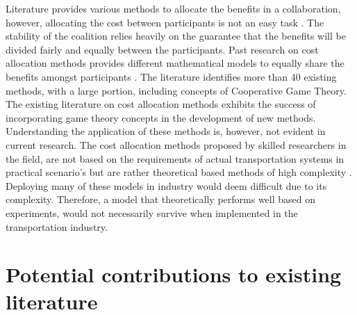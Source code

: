 Literature provides various methods to allocate the benefits in a collaboration, however, allocating the cost between participants is not an easy task \citep{lozano2013cooperative}. The stability of the coalition relies heavily on the guarantee that the benefits will be divided fairly and equally between the participants. Past research on cost allocation methods provides different mathematical models to equally share the benefits amongst participants \citep{lozano2013cooperative}. The literature identifies more than 40 existing methods, with a large portion, including concepts of Cooperative Game Theory. The existing literature on cost allocation methods exhibits the success of incorporating game theory concepts in the development of new methods. Understanding the application of these methods is, however, not evident in current research. The cost allocation methods proposed by skilled researchers in the field, are not based on the requirements of actual transportation systems in practical scenario's but are rather theoretical based methods of high complexity \citep{ozener2008allocating}. Deploying many of these models in industry would deem difficult due to its complexity. Therefore, a model that theoretically performs well based on experiments, would not necessarily survive when implemented in the transportation industry.




\section{Potential contributions to existing literature }

